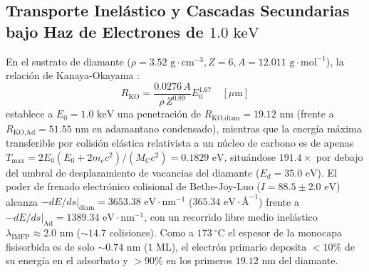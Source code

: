 \documentclass[10pt,twocolumn,a4paper]{article}
\begin{document}
\subsection{Transporte Inelástico y Cascadas Secundarias bajo Haz de Electrones de $1.0\text{ keV}$}
En el sustrato de diamante ($\rho = 3.52\text{ g}\cdot\text{cm}^{-3}, Z=6, A=12.011\text{ g}\cdot\text{mol}^{-1}$), la relación de Kanaya-Okayama \cite{Kanaya1972}:
\begin{equation}
R_{\text{KO}} = \frac{0.0276\,A}{\rho\,Z^{0.89}} E_0^{1.67}\quad [\mu\text{m}]
\end{equation}
establece a $E_0 = 1.0\text{ keV}$ una penetración de $R_{\text{KO,diam}} = 19.12\text{ nm}$ (frente a $R_{\text{KO,Ad}} = 51.55\text{ nm}$ en adamantano condensado), mientras que la energía máxima transferible por colisión elástica relativista a un núcleo de carbono es de apenas $T_{\text{max}} = 2 E_0 (E_0 + 2 m_e c^2)/(M_{\text{C}} c^2) = 0.1829\text{ eV}$, situándose $191.4\times$ por debajo del umbral de desplazamiento de vacancias del diamante ($E_d = 35.0\text{ eV}$). El poder de frenado electrónico colisional de Bethe-Joy-Luo ($I = 88.5 \pm 2.0\text{ eV}$) alcanza $-\left.dE/ds\right|_{\text{diam}} = 3653.38\text{ eV}\cdot\text{nm}^{-1}$ ($365.34\text{ eV}\cdot\text{\AA}^{-1}$) frente a $-\left.dE/ds\right|_{\text{Ad}} = 1389.34\text{ eV}\cdot\text{nm}^{-1}$, con un recorrido libre medio inelástico $\lambda_{\text{IMFP}} \approx 2.0\text{ nm}$ ($\sim 14.7$ colisiones). Como a $173\ ^\circ\text{C}$ el espesor de la monocapa fisisorbida es de solo $\sim 0.74\text{ nm}$ ($1\text{ ML}$), el electrón primario deposita $<10\%$ de su energía en el adsorbato y $>90\%$ en los primeros $19.12\text{ nm}$ del diamante.
\end{document}
